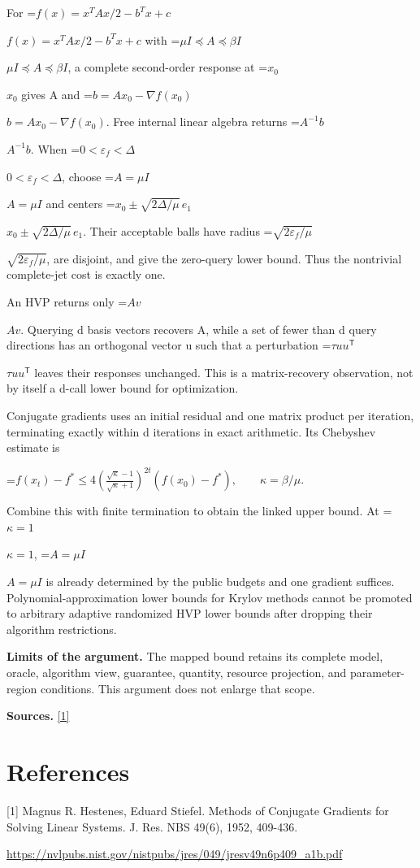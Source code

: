 \documentclass[10pt,a4paper]{article}
\newcommand{\AtlasMath}[1]{\par\begingroup\centering\setbox0=\hbox{$\displaystyle #1$}\ifdim\wd0>1.4\linewidth\typeout{ATLAS WIDE FORMULA: \the\wd0}\fi\ifdim\wd0>\linewidth\resizebox{\linewidth}{!}{\box0}\else\box0\fi\par\endgroup}
\newcommand{\AtlasInlineMath}[1]{\begingroup\setbox0=\hbox{$#1$}\ifdim\wd0>.4\linewidth\endgroup\AtlasMath{#1}\else\endgroup$#1$\fi}
\begin{document}
For \AtlasInlineMath{f(x)=x^TAx/2-b^Tx+c} with \AtlasInlineMath{\mu I\preceq A\preceq\beta I}, a complete second-order response at \AtlasInlineMath{x_0} gives A and \AtlasInlineMath{b=Ax_0-\nabla f(x_0)}. Free internal linear algebra returns \AtlasInlineMath{A^{-1}b}. When \AtlasInlineMath{0<\varepsilon_f<\Delta}, choose \AtlasInlineMath{A=\mu I} and centers \AtlasInlineMath{x_0\pm\sqrt{2\Delta/\mu}\,e_1}. Their acceptable balls have radius \AtlasInlineMath{\sqrt{2\varepsilon_f/\mu}}, are disjoint, and give the zero-query lower bound. Thus the nontrivial complete-jet cost is exactly one.

An HVP returns only \AtlasInlineMath{Av}. Querying d basis vectors recovers A, while a set of fewer than d query directions has an orthogonal vector u such that a perturbation \AtlasInlineMath{\tau uu^{\mathsf T}} leaves their responses unchanged. This is a matrix-recovery observation, not by itself a d-call lower bound for optimization.

Conjugate gradients uses an initial residual and one matrix product per iteration, terminating exactly within d iterations in exact arithmetic. Its Chebyshev estimate is

\AtlasMath{f(x_t)-f^*\le4\left(\frac{\sqrt\kappa-1}{\sqrt\kappa+1}\right)^{2t}(f(x_0)-f^*),\qquad\kappa=\beta/\mu.}

Combine this with finite termination to obtain the linked upper bound. At \AtlasInlineMath{\kappa=1}, \AtlasInlineMath{A=\mu I} is already determined by the public budgets and one gradient suffices. Polynomial-approximation lower bounds for Krylov methods cannot be promoted to arbitrary adaptive randomized HVP lower bounds after dropping their algorithm restrictions.

\textbf{Limits of the argument.} The mapped bound retains its complete model, oracle, algorithm view, guarantee, quantity, resource projection, and parameter-region conditions. This argument does not enlarge that scope.

\textbf{Sources.} \href{https://nvlpubs.nist.gov/nistpubs/jres/049/jresv49n6p409_a1b.pdf}{[1]}

\section{References}
[1] Magnus R. Hestenes, Eduard Stiefel. Methods of Conjugate Gradients for Solving Linear Systems. J. Res. NBS 49(6), 1952, 409-436.

\url{https://nvlpubs.nist.gov/nistpubs/jres/049/jresv49n6p409_a1b.pdf}
\end{document}
